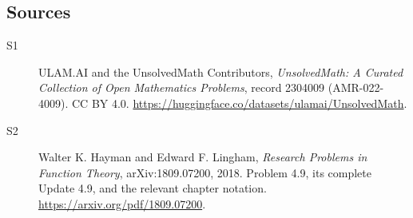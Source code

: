 \documentclass[11pt]{book}
\begin{document}
\subsection{Sources}
\begin{description}
\item[\hypertarget{source:2304009:1}{S1}] ULAM.AI and the UnsolvedMath Contributors, \emph{UnsolvedMath: A Curated Collection of Open Mathematics Problems}, record 2304009 (AMR-022-4009). CC BY 4.0. \url{https://huggingface.co/datasets/ulamai/UnsolvedMath}.
\item[\hypertarget{source:2304009:2}{S2}] Walter K. Hayman and Edward F. Lingham, \emph{Research Problems in Function Theory}, arXiv:1809.07200, 2018. Problem 4.9, its complete Update 4.9, and the relevant chapter notation. \url{https://arxiv.org/pdf/1809.07200}.
\end{description}
\label{end:2304009}
\end{document}

